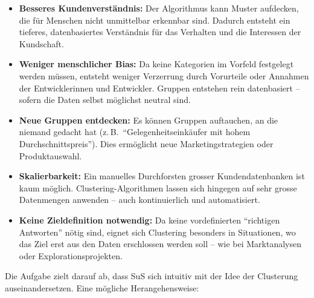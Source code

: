 \begin{aufgabe}{1}
\begin{itemize}
\begin{itemize}
  \item \textbf{Besseres Kundenverständnis:} Der Algorithmus kann Muster aufdecken, die für Menschen nicht unmittelbar erkennbar sind. Dadurch entsteht ein tieferes, datenbasiertes Verständnis für das Verhalten und die Interessen der Kundschaft.

  \item \textbf{Weniger menschlicher Bias:} Da keine Kategorien im Vorfeld festgelegt werden müssen, entsteht weniger Verzerrung durch Vorurteile oder Annahmen der Entwicklerinnen und Entwickler. Gruppen entstehen rein datenbasiert – sofern die Daten selbst möglichst neutral sind.

  \item \textbf{Neue Gruppen entdecken:} Es können Gruppen auftauchen, an die niemand gedacht hat (z.\,B.\ ``Gelegenheitseinkäufer mit hohem Durchschnittspreis''). Dies ermöglicht neue Marketingstrategien oder Produktauswahl.

  \item \textbf{Skalierbarkeit:} Ein manuelles Durchforsten grosser Kundendatenbanken ist kaum möglich. Clustering-Algorithmen lassen sich hingegen auf sehr grosse Datenmengen anwenden – auch kontinuierlich und automatisiert.

  \item \textbf{Keine Zieldefinition notwendig:} Da keine vordefinierten ``richtigen Antworten'' nötig sind, eignet sich Clustering besonders in Situationen, wo das Ziel erst aus den Daten erschlossen werden soll – wie bei Marktanalysen oder Explorationsprojekten.
\end{itemize}
\end{itemize}
\end{aufgabe}

Die Aufgabe zielt darauf ab, dass SuS sich intuitiv mit der Idee der Clusterung auseinandersetzen. Eine mögliche Herangehensweise:


